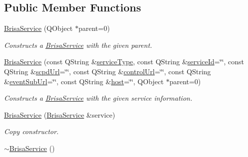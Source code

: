 \subsection*{Public Member Functions}
\begin{DoxyCompactItemize}
\item 
\hyperlink{classBrisaUpnp_1_1BrisaService_ac545cd7f0be250187f84fd26c9e58433}{BrisaService} (QObject $\ast$parent=0)
\begin{DoxyCompactList}\small\item\em Constructs a \hyperlink{classBrisaUpnp_1_1BrisaService}{BrisaService} with the given parent. \item\end{DoxyCompactList}\item 
\hyperlink{classBrisaUpnp_1_1BrisaService_a83a4522dce19621d62a4997ec8bcb89f}{BrisaService} (const QString \&\hyperlink{classBrisaUpnp_1_1BrisaAbstractService_a670933cc6c8581e2f70f52a97d425e4c}{serviceType}, const QString \&\hyperlink{classBrisaUpnp_1_1BrisaAbstractService_ad72b169651a6c617d27d51e7f706410d}{serviceId}=\char`\"{}\char`\"{}, const QString \&\hyperlink{classBrisaUpnp_1_1BrisaAbstractService_aa254b466f38b49b921ed7a25aea7cc8c}{scpdUrl}=\char`\"{}\char`\"{}, const QString \&\hyperlink{classBrisaUpnp_1_1BrisaAbstractService_acc5a45e07d8da5d8e086b02f4a22cc78}{controlUrl}=\char`\"{}\char`\"{}, const QString \&\hyperlink{classBrisaUpnp_1_1BrisaAbstractService_a81d2525c94d2b9572c962089c388f8f9}{eventSubUrl}=\char`\"{}\char`\"{}, const QString \&\hyperlink{classBrisaUpnp_1_1BrisaAbstractService_a9033d7f9255f3a1b6d3540258bf2ade1}{host}=\char`\"{}\char`\"{}, QObject $\ast$parent=0)
\begin{DoxyCompactList}\small\item\em Constructs a \hyperlink{classBrisaUpnp_1_1BrisaService}{BrisaService} with the given service information. \item\end{DoxyCompactList}\item 
\hyperlink{classBrisaUpnp_1_1BrisaService_a10bc466757f498d3948dd677ee7fb759}{BrisaService} (\hyperlink{classBrisaUpnp_1_1BrisaService}{BrisaService} \&service)
\begin{DoxyCompactList}\small\item\em Copy constructor. \item\end{DoxyCompactList}\item 
\hyperlink{classBrisaUpnp_1_1BrisaService_a46039d40b277bac4b50112d75d5f03c7}{$\sim$BrisaService} ()

\end{DoxyCompactItemize}
